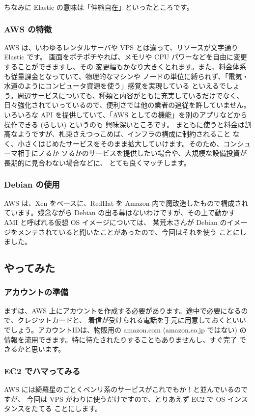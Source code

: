 \documentclass[mingoth,a4paper]{jsarticle}
\begin{document}
ちなみに Elastic の意味は「伸縮自在」といったところです。

\subsubsection{AWS の特徴}
AWS は、いわゆるレンタルサーバや VPS とは違って、リソースが文字通り Elastic です。
画面をポチポチやれば、メモリや CPU パワーなどを自由に変更することができますし、その
変更幅もかなり大きくとれます。また、料金体系も従量課金となっていて、物理的なマシンや
ノードの単位に縛られず、「電気・水道のようにコンピュータ資源を使う」感覚を実現している
といえるでしょう。周辺サービスについても、種類と内容がともに充実しているだけでなく、
日々強化されていっているので、便利さでは他の業者の追従を許していません。いろいろな API
を提供していて、「AWS としての機能」を別のアプリなどから操作できる (らしい) というのも
興味深いところです。
まともに使うと料金は割高なようですが、札束さえつっこめば、インフラの構成に制約されること
なく、小さくはじめたサービスをそのまま拡大していけます。そのため、コンシューマ相手にノるか
ソるかのサービスを提供したい場合や、大規模な設備投資が長期的に見合わない場合などに、
とても良くマッチします。

\subsubsection{Debian の使用}
AWS は、Xen をベースに、RedHat を Amazon 内で魔改造したもので構成されています。残念ながら
Debian の出る幕はないわけですが、その上で動かす AMI と呼ばれる仮想 OS イメージについては、
某荒木さんが Debian のイメージをメンテされていると聞いたことがあったので、今回はそれを使う
ことにしました。

\subsection{やってみた}
\subsubsection{アカウントの準備}
まずは、AWS 上にアカウントを作成する必要があります。途中で必要になるので、クレジットカードと、
着信が受けられる電話を手元に用意しておくといいでしょう。アカウントIDは、物販用の amazon.com
(amazon.co.jp ではない) の情報を流用できます。特に待たされたりすることもありませんし、すぐ完了
できるかと思います。

\subsubsection{EC2 でハマってみる}
AWS には綺羅星のごとくベンリ系のサービスがこれでもか！と並んでいるのですが、
今回は VPS がわりに使うだけですので、とりあえず EC2 で OS インスタンスをたてる
ことにします。
\end{document}
